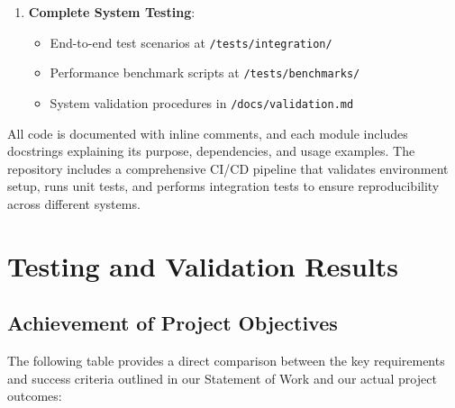 \documentclass[12pt]{article}
\begin{document}
\begin{enumerate}
    \item \textbf{Complete System Testing}:
    \begin{itemize}
        \item End-to-end test scenarios at \texttt{/tests/integration/}
        \item Performance benchmark scripts at \texttt{/tests/benchmarks/}
        \item System validation procedures in \texttt{/docs/validation.md}
    \end{itemize}
\end{enumerate}

All code is documented with inline comments, and each module includes docstrings explaining its purpose, dependencies, and usage examples. The repository includes a comprehensive CI/CD pipeline that validates environment setup, runs unit tests, and performs integration tests to ensure reproducibility across different systems.

\section{Testing and Validation Results}

\subsection{Achievement of Project Objectives}

The following table provides a direct comparison between the key requirements and success criteria outlined in our Statement of Work and our actual project outcomes:
\end{document}
